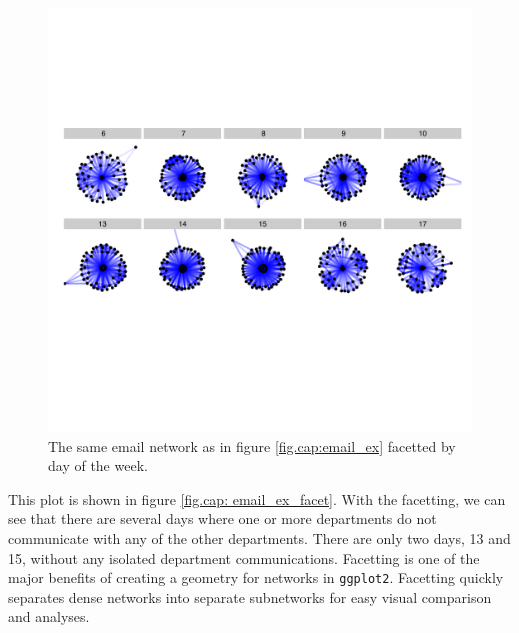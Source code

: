\documentclass[11pt]{article}\usepackage[]{graphicx}\usepackage[]{color}
\begin{document}
\begin{landscape}
\begin{figure}
\centering
\includegraphics[width=8in]{figure/email_ex_facet-1.pdf}
\caption{\label{fig.cap:email_ex_facet} The same email network as in figure \ref{fig.cap:email_ex} facetted by day of the week.}
\end{figure}
\end{landscape}
This plot is shown in figure \ref{fig.cap: email_ex_facet}. With the facetting, we can see that there are several days where one or more departments do not communicate with any of the other departments. There are only two days, 13 and 15, without any isolated department communications. Facetting is one of the major benefits of creating a geometry for networks in \texttt{ggplot2}.  Facetting quickly separates dense networks into separate subnetworks for easy visual comparison and  analyses.
\end{document}
